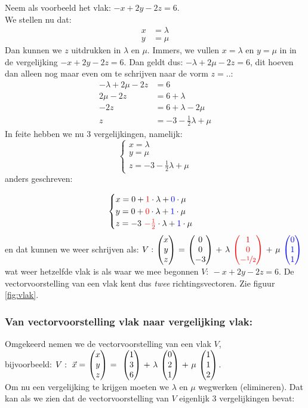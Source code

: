 Neem als voorbeeld het vlak: $ -x + 2y -2z = 6 $. \\
We stellen  nu dat:
\begin{align*}
  x &= \lambda \\
  y &= \mu  
\end{align*}
Dan kunnen we $ z$ uitdrukken in $ \lambda $  en $ \mu $. Immers, we vullen  $ x=  \lambda $ en $ y = \mu $ in in de vergelijking $ -x + 2y -2z = 6 $. Dan geldt dus: $ -\lambda + 2\mu -2z = 6 $, dit hoeven dan alleen nog maar even om te schrijven naar de vorm $z = ..$:
\begin{align*}
  -\lambda + 2\mu -2z &= 6 \\
  2\mu -2z &= 6 + \lambda \\
  -2z &= 6 + \lambda - 2\mu \\
  z &= -3 -\frac{1}{2}\lambda + \mu 
\end{align*}
In feite hebben we nu $3$ vergelijkingen, namelijk:
\[\begin{cases}
x =  \lambda\\
y =  \mu\\
z = -3 -\frac{1}{2}\lambda + \mu 
\end{cases}
\] 
anders geschreven:

\[\begin{cases}
x =  0 + {\color{red}1}\cdot\lambda +  {\color{blue}0}\cdot\mu\\
y =  0 +  {\color{red}0}\cdot\lambda  + {\color{blue}1}\cdot \mu\\
z = -3 \  {\color{red}- \frac{1}{2}} \cdot\lambda + {\color{blue}1}\cdot\mu 
\end{cases}
\] 
en dat kunnen we weer schrijven als:
$ V: \ \vecdrie{x}{y}{z} \ = \ \vecdrie{0}{0}{-3} \ + \ \lambda \  \vecdrie[red]{1}{0}{-\nicefrac{1} {2}}   \ + \ \mu \ \vecdrie[blue]{0}{1}{1} $ wat weer hetzelfde vlak is als waar we mee begonnen $ V: \ -x + 2y -2z = 6 $.
De vectorvoorstelling van een vlak kent dus \textit{twee}  richtingsvectoren. 
Zie  figuur  \ref{fig:vlak}.

\newpage
\subsubsection{Van vectorvoorstelling vlak naar vergelijking vlak:}
Omgekeerd nemen we de vectorvoorstelling van een vlak $ V $,\\ 
bijvoorbeeld:
$ V: \  \vec{x} =\  \vecdrie{x}{y}{z} \ = \  \ \vecdrie{1}{3}{6} \ + \ \lambda \ \vecdrie{0}{2}{1} \ + \ \mu \ \vecdrie{1}{1}{2} $.\\
Om nu een vergelijking te krijgen moeten we $ \lambda $  en $ \mu $ wegwerken (elimineren). Dat kan als we zien dat de vectorvoorstelling van $ V $ eigenlijk 3 vergelijkingen bevat:

